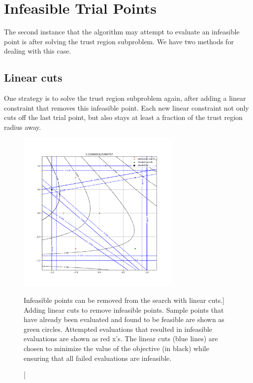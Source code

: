\section{Infeasible Trial Points}
\label{convex_model_reduction}
The second instance that the algorithm may attempt to evaluate an infeasible point is after solving the trust region subproblem.
We have two methods for dealing with this case.

\subsection{Linear cuts}
\label{linear_cuts_section}

One strategy is to solve the trust region subproblem again, after adding a linear constraint that removes this infeasible point.
Each new linear constraint not only cuts off the last trial point, but also stays at least a fraction of the trust region radius away.

\begin{figure}[ht]
    \centering
    \includegraphics[width=300px]{images/pyomo_cut_solution.png}
    \caption
    		[Infeasible points can be removed from the search with linear cuts.]
    	{
			Adding linear cuts to remove infeasible points.
			Sample points that have already been evaluated and found to be feasible are shown as green circles.
			Attempted evaluations that resulted in infeasible evaluations are shown as red x's.
			The linear cuts (blue lines) are chosen to minimize the value of the objective (in black) while ensuring that all failed evaluations are infeasible.
	}
    \label{pvip}
\end{figure}


